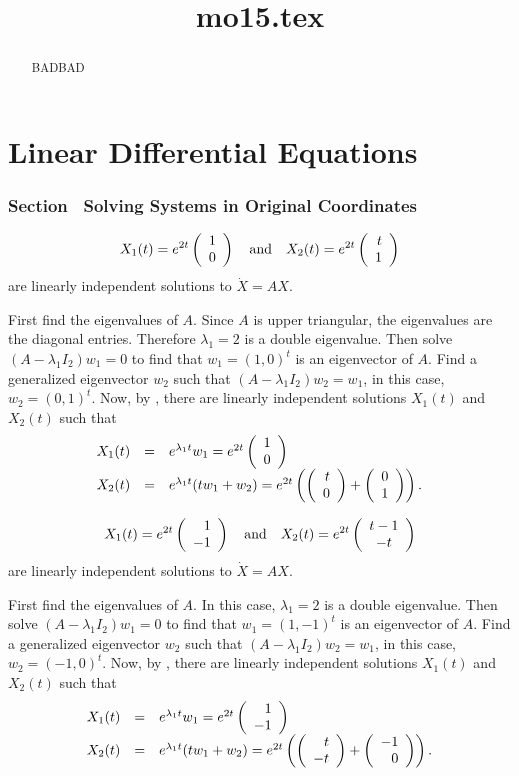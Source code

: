 \documentclass{ximera}
\title{mo15.tex}
\begin{document}
\begin{abstract}
BADBAD
\end{abstract}
\maketitle

\chapter{Linear Differential Equations}

\subsection*{Section~\protect{\ref{S:SEOC}} Solving Systems in Original Coordinates}

 \ans
\[
X_1(t) = e^{2t}\left(\begin{array}{r} 1 \\ 0\end{array}\right) \quad\mbox{and}\quad
X_2(t) = e^{2t}\left(\begin{array}{r} t \\ 1\end{array}\right)
\]
are linearly independent solutions to $\dot{X} = AX$.

\soln First find the eigenvalues of $A$.  Since $A$ is upper triangular,
the eigenvalues are the diagonal entries.  Therefore $\lambda_1 = 2$
is a double eigenvalue.  Then solve $(A - \lambda_1 I_2)w_1 = 0$ to
find that $w_1 = (1,0)^t$ is an eigenvector of $A$.  Find a
generalized eigenvector $w_2$ such that $(A - \lambda_1 I_2)w_2 =
w_1$, in this case, $w_2 = (0,1)^t$.  Now, by ,
there are linearly independent solutions $X_1(t)$ and $X_2(t)$ such that
\[
\begin{array}{rcl}
X_1(t) & = & e^{\lambda_1 t}w_1 = e^{2t}\left(\begin{array}{r} 1 \\ 0\end{array}\right) \\ X_2(t) & = &
e^{\lambda_1 t}(tw_1 + w_2) = e^{2t}\left(\left(\begin{array}{r} t \\ 0\end{array}\right) +
\left(\begin{array}{r} 0 \\ 1\end{array}\right)\right).
\end{array}
\]

 \ans
\[
X_1(t) = e^{2t}\left(\begin{array}{r} 1 \\ -1\end{array}\right) \quad\mbox{and}\quad
X_2(t) = e^{2t}\left(\begin{array}{c} t - 1 \\ -t\end{array}\right)
\]
are linearly independent solutions to $\dot{X} = AX$.

\soln First find the eigenvalues of $A$.  In this case, $\lambda_1 = 2$
is a double eigenvalue.  Then solve $(A - \lambda_1 I_2)w_1 = 0$ to
find that $w_1 = (1,-1)^t$ is an eigenvector of $A$.  Find a
generalized eigenvector $w_2$ such that $(A - \lambda_1 I_2)w_2 =
w_1$, in this case, $w_2 = (-1,0)^t$.  Now, by ,
there are linearly independent solutions $X_1(t)$ and $X_2(t)$ such that
\[
\begin{array}{rcl}
X_1(t) & = & e^{\lambda_1 t}w_1 = e^{2t}\left(\begin{array}{r} 1 \\ -1\end{array}\right) \\
X_2(t) & = & e^{\lambda_1 t}(tw_1 + w_2) = e^{2t}\left(\left(\begin{array}{r} t \\ -t\end{array}\right) +
\left(\begin{array}{r} -1 \\ 0\end{array}\right)\right).
\end{array}
\]
\end{document}
